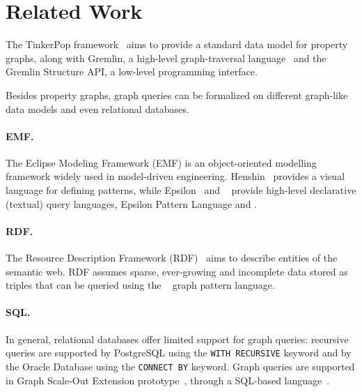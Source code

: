 \section{Related Work}
\label{sec:related-work}

The TinkerPop framework~\cite{TinkerPop} aims to provide a standard data model for property graphs, along with Gremlin, a high-level graph-traversal language~\cite{Rodriguez:2015:GGT:2815072.2815073} and the Gremlin Structure API, a low-level programming interface.

Besides property graphs, graph queries can be formalized on different graph-like data models and even relational databases.

\paragraph{EMF.} The Eclipse Modeling Framework (EMF) is an object-oriented modelling framework widely used in model-driven engineering. 
Henshin~\cite{DBLP:conf/models/ArendtBJKT10} provides a visual language for defining patterns, while Epsilon~\cite{DBLP:conf/icmt/KolovosPP08} and \viatraquery~\cite{DBLP:conf/models/BergmannHRVBBO10} provide high-level declarative (textual) query languages, Epsilon Pattern Language and \vql.

\paragraph{RDF.} The Resource Description Framework (RDF)~\cite{RDF} aims to describe entities of the semantic web. RDF assumes sparse, ever-growing and incomplete data stored as triples that can be queried using the \sparql~\cite{SPARQL} graph pattern language.

\lstset{language=}

\paragraph{SQL.} In general, relational databases offer limited support for graph queries: recursive queries are supported by \mbox{PostgreSQL} using the \lstinline+WITH RECURSIVE+ keyword and by the Oracle Database using the \lstinline+CONNECT BY+ keyword. Graph queries are supported in \saphana Graph
Scale-Out Extension prototype~\cite{DBLP:conf/btw/RudolfPBL13}, through a SQL-based language~\cite{DBLP:conf/gg/KrauseJDSKN16}.

\lstset{language=Cypher}
